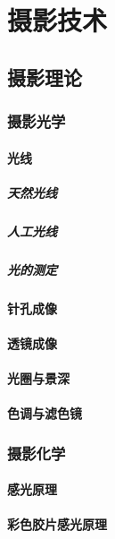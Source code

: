 \documentclass[UTF8]{../../ApplicationUniverse}
\begin{document}
\chapter{摄影技术}
\section{摄影理论}
    \subsection{摄影光学}
        \subsubsection{光线}
            \paragraph{天然光线}
            \paragraph{人工光线}
            \paragraph{光的测定}
        \subsubsection{针孔成像}
        \subsubsection{透镜成像}
        \subsubsection{光圈与景深}
        \subsubsection{色调与滤色镜}
    \subsection{摄影化学}
        \subsubsection{感光原理}
        \subsubsection{彩色胶片感光原理}
\end{document}
